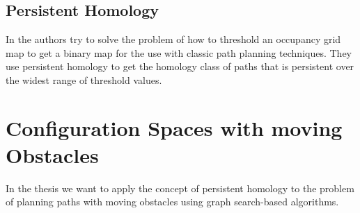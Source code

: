 \documentclass[]{article}
\begin{document}
\subsection*{Persistent Homology}
In \cite{bhattacharyaPersistentHomologyPath2015} the authors try to
solve the problem of how to threshold an occupancy grid map to get a
binary map for the use with classic path planning techniques. They use
persistent homology to get the homology class of paths that is
persistent over the widest range of threshold values.

\section*{Configuration Spaces with moving Obstacles}
In the thesis we want to apply the concept of persistent homology to
the problem of planning paths with moving obstacles using graph
search-based algorithms.


 
\end{document}
